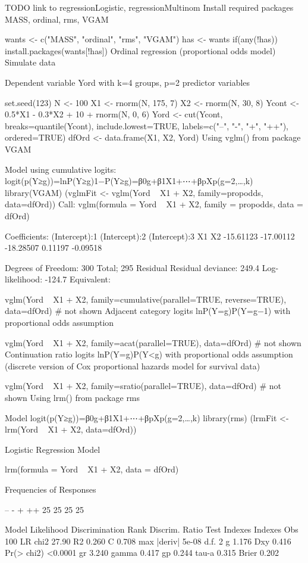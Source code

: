 TODO
link to regressionLogistic, regressionMultinom
Install required packages
MASS, ordinal, rms, VGAM

wants <- c("MASS", "ordinal", "rms", "VGAM")
has   <- wants %
if(any(!has)) install.packages(wants[!has])
Ordinal regression (proportional odds model)
Simulate data

Dependent variable Yord with k=4 groups, p=2 predictor variables

set.seed(123)
N     <- 100
X1    <- rnorm(N, 175, 7)
X2    <- rnorm(N,  30, 8)
Ycont <- 0.5*X1 - 0.3*X2 + 10 + rnorm(N, 0, 6)
Yord  <- cut(Ycont, breaks=quantile(Ycont), include.lowest=TRUE,
             labels=c("--", "-", "+", "++"), ordered=TRUE)
dfOrd <- data.frame(X1, X2, Yord)
Using vglm() from package VGAM

Model using cumulative logits: logit(p(Y≥g))=lnP(Y≥g)1−P(Y≥g)=β0g+β1X1+⋯+βpXp(g=2,…,k)
library(VGAM)
(vglmFit <- vglm(Yord ~ X1 + X2, family=propodds, data=dfOrd))
Call:
vglm(formula = Yord ~ X1 + X2, family = propodds, data = dfOrd)

Coefficients:
(Intercept):1 (Intercept):2 (Intercept):3            X1            X2 
    -15.61123     -17.00112     -18.28507       0.11197      -0.09518 

Degrees of Freedom: 300 Total; 295 Residual
Residual deviance: 249.4 
Log-likelihood: -124.7 
Equivalent:

vglm(Yord ~ X1 + X2, family=cumulative(parallel=TRUE, reverse=TRUE), data=dfOrd)
# not shown
Adjacent category logits lnP(Y=g)P(Y=g−1) with proportional odds assumption

vglm(Yord ~ X1 + X2, family=acat(parallel=TRUE), data=dfOrd)
# not shown
Continuation ratio logits lnP(Y=g)P(Y<g) with proportional odds assumption (discrete version of Cox proportional hazards model for survival data)

vglm(Yord ~ X1 + X2, family=sratio(parallel=TRUE), data=dfOrd)
# not shown
Using lrm() from package rms

Model logit(p(Y≥g))=β0g+β1X1+⋯+βpXp(g=2,…,k)
library(rms)
(lrmFit <- lrm(Yord ~ X1 + X2, data=dfOrd))

Logistic Regression Model

lrm(formula = Yord ~ X1 + X2, data = dfOrd)

Frequencies of Responses

--  -  + ++ 
25 25 25 25 

                      Model Likelihood     Discrimination    Rank Discrim.    
                         Ratio Test            Indexes          Indexes       
Obs           100    LR chi2      27.90    R2       0.260    C       0.708    
max |deriv| 5e-08    d.f.             2    g        1.176    Dxy     0.416    
                     Pr(> chi2) <0.0001    gr       3.240    gamma   0.417    
                                           gp       0.244    tau-a   0.315    
                                           Brier    0.202                     


